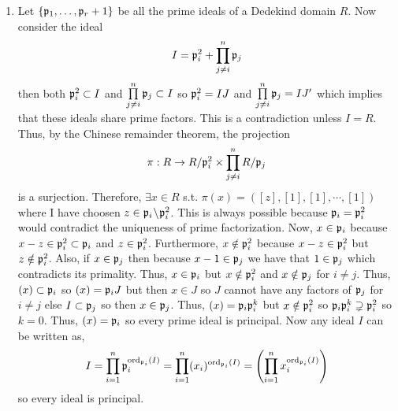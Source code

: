 \documentclass[12pt]{extarticle}
\begin{document}
\begin{enumerate}
\item Let $\{\mathfrak{p}_1, \dots, \mathfrak{p}_r+1 \}$ be all the prime ideals of a Dedekind domain $R$. Now consider the ideal \[ I = \mathfrak{p}_i^2  + \prod\limits_{j \neq i}^n \mathfrak{p}_j\]
then both $\mathfrak{p}_i^2 \subset I$ and $\prod\limits_{j \neq i}^n \mathfrak{p}_j \subset I$ so $\mathfrak{p}_i^2 = IJ$ and $\prod\limits_{j \neq i}^n \mathfrak{p}_j = IJ'$ which implies that these ideals share prime factors. This is a contradiction unless $I = R$. Thus, by the Chinese remainder theorem, the projection \[\pi : R \to R/\mathfrak{p}_i^2 \times \prod_{j \neq i}^n R/\mathfrak{p}_j\]
is a surjection. Therefore, $\exists x \in R$ s.t. $\pi(x) = ([z], [1], [1], \cdots, [1])$
where I have choosen $z \in \mathfrak{p}_i \! \setminus \! \mathfrak{p}_i^2$. This is always possible because $\mathfrak{p}_i = \mathfrak{p}_i^2$ would contradict the uniqueness of prime factorization. Now, $x \in \mathfrak{p}_i$ because $x - z \in \mathfrak{p}_i^2 \subset \mathfrak{p}_i$ and $z \in \mathfrak{p}_i^2$. Furthermore, $x \notin \mathfrak{p}_i^2$ because $x - z \in \mathfrak{p}_i^2$ but $z \notin \mathfrak{p}_i^2$. Also, if $x \in \mathfrak{p}_j$ then because $x - 1 \in \mathfrak{p}_j$ we have that $1 \in \mathfrak{p}_j$ which contradicts its primality. Thus, $x \in \mathfrak{p}_i$ but $x \notin \mathfrak{p}_i^2$ and $x \notin \mathfrak{p}_j$ for $i \neq j$. Thus, $(x) \subset \mathfrak{p}_i$ so $(x) = \mathfrak{p}_i J$ but then $x \in J$ so $J$ cannot have any factors of $\mathfrak{p}_j$ for $i \neq j$ else $I \subset \mathfrak{p}_j$ so then $x \in \mathfrak{p}_j$. Thus, $(x) = \mathfrak{p}_i \mathfrak{p}_i^k$ but $x \notin \mathfrak{p}_i^2$ so $\mathfrak{p}_i \mathfrak{p}_i^k \supsetneq \mathfrak{p}_i^2$ so $k = 0$. Thus, $(x) = \mathfrak{p}_i$ so every prime ideal is principal. Now any ideal $I$ can be written as,
\[I = \prod_{i = 1}^{n} \mathfrak{p}_i^{\mathrm{ord}_{\mathfrak{p}_i}(I)} = \prod_{i = 1}^{n} (x_i)^{\mathrm{ord}_{\mathfrak{p}_i}(I)} = \left(\prod_{i = 1}^{n} x_i^{\mathrm{ord}_{\mathfrak{p}_i}(I)} \right) \] 
so every ideal is principal. 
\end{enumerate}
\end{document}
